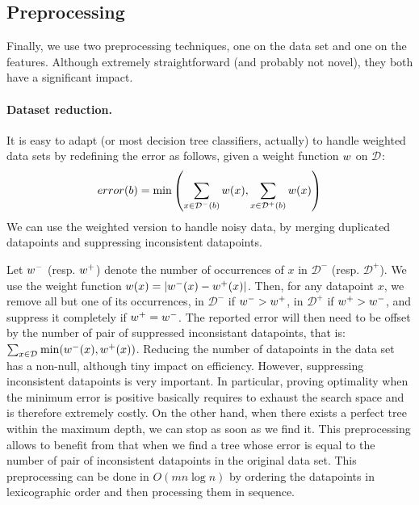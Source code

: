 \documentclass{llncs}
\def\posclass{+}
\def\negclass{-}
\def\datasymb{D}
\newcommand{\setex}[1]{\ensuremath{{\mathcal \datasymb}^{#1}}\xspace}
\newcommand{\posex}{{\setex{\posclass}}\xspace}
\newcommand{\negex}{{\setex{\negclass}}\xspace}
\newcommand{\allex}{{\setex{}}\xspace}
\newcommand{\afeat}[0]{\ensuremath{f}}
\newcommand{\weight}[1][]{\ensuremath{\ifthenelse{\equal{#1}{}}{w}{w({#1})}}}
\newcommand{\error}[1][]{\ensuremath{\ifthenelse{\equal{#1}{}}{{error}}{{error({{#1}})}}}}
\newcommand{\abranch}[0]{\ensuremath{b}}
\newcommand{\numex}[0]{\ensuremath{n}}
\newcommand{\numfeat}[0]{\ensuremath{m}}
\newcommand{\mdepth}[0]{\ensuremath{k}}
\begin{document}









\subsection{Preprocessing}
\label{sec:preprocessing}

Finally, we use two preprocessing techniques, one on the data set and one on the features. Although extremely straightforward (and probably not novel), they both have a significant impact.

\paragraph{Dataset reduction.}
It is easy to adapt \budalg (or most decision tree classifiers, actually) to handle weighted data sets by redefining the error as follows, given a weight function $\weight$ on $\allex$:
$$
\error[\abranch] = \min\left( \sum\limits_{x \in \negex(\abranch)}\weight[x], \sum\limits_{x \in \posex(\abranch)}\weight[x] \right)
$$
We can use the weighted version to handle noisy data, by merging duplicated datapoints and suppressing inconsistent datapoints.

Let $\weight^{\negclass}$ (resp. $\weight^{\posclass}$) denote the number of occurrences of $x$ in $\setex{\negclass}$ (resp. $\setex{\posclass}$). We use the weight function $\weight[x] = |\weight^{\negclass}(x) - \weight^{\posclass}(x)|$. Then, for any datapoint $x$, we remove all but one of its occurrences, in $\setex{\negclass}$ if $\weight^{\negclass}>\weight^{\posclass}$, in $\setex{\posclass}$ if $\weight^{\posclass}>\weight^{\negclass}$, and suppress it completely if $\weight^{\posclass}=\weight^{\negclass}$.
The reported error will then need to be offset by the number of pair of suppressed inconsistant datapoints, that is:
$
\sum_{x \in \allex}\min(\weight^{\negclass}(x), \weight^{\posclass}(x))
$.
Reducing the number of datapoints in the data set has a non-null, although tiny impact on efficiency. However, suppressing inconsistent datapoints is very important. In particular, proving optimality when the minimum error is positive basically requires to exhaust the search space and is therefore extremely costly. On the other hand, when there exists a perfect tree within the maximum depth, we can stop as soon as we find it. This preprocessing allows to benefit from that when we find a tree whose error is equal to the number of pair of inconsistent datapoints in the original data set.
This preprocessing can be done in $O(\numfeat \numex \log \numex)$ by ordering the datapoints in lexicographic order and then processing them in sequence.
\end{document}
